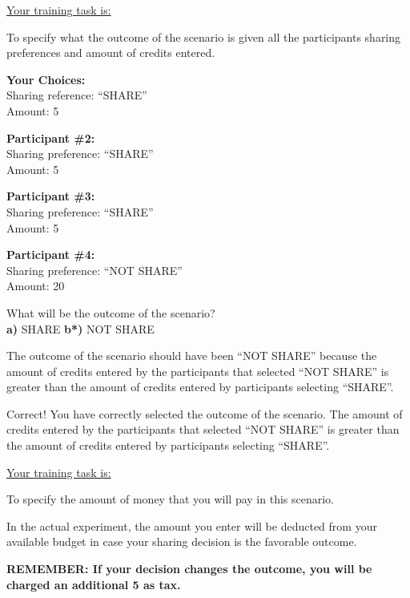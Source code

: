 
\underline{Your training task is:} 

To specify what the outcome of the scenario is given all the participants sharing preferences and amount of credits entered.

\clearpage
\textbf{Your Choices:} \\
\indent \indent Sharing reference: 	``SHARE'' \\
\indent \indent Amount:		5 

\textbf{Participant \#2:} \\ 
\indent \indent Sharing preference:	``SHARE'' \\
\indent \indent Amount: 		5

\textbf{Participant \#3:} \\
\indent \indent Sharing preference:	``SHARE'' \\
\indent \indent Amount: 		5

\textbf{Participant \#4:} \\
\indent \indent Sharing preference:	``NOT SHARE'' \\
\indent \indent Amount: 		20  

What will be the outcome of the scenario? \\
\indent \textbf{a)} SHARE \indent \indent \textbf{b*)} NOT SHARE 

 The outcome of the scenario should have been ``NOT SHARE'' because the amount of credits entered by the participants that selected ``NOT SHARE'' is greater than the amount of credits entered by participants selecting ``SHARE''.

 Correct! You have correctly selected the outcome of the scenario. The amount of credits entered by the participants that selected ``NOT SHARE'' is greater than the amount of credits entered by participants selecting ``SHARE''.




\underline{Your training task is:}

To specify the amount of money that you will pay in this scenario. 

In the actual experiment, the amount you enter will be deducted from your available budget in case your sharing decision is the favorable outcome.

\textbf{REMEMBER:  If your decision changes the outcome, you will be charged an additional 5 as tax.}

